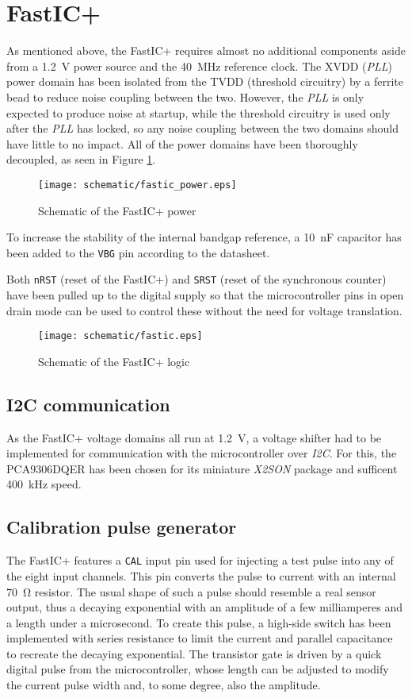\section{FastIC+}
As mentioned above, the FastIC+ requires almost no additional components aside from a \SI{1.2}{\volt} power source and the \SI{40}{\mega\hertz} reference clock. The XVDD (\emph{PLL}) power domain has been isolated from the TVDD (threshold circuitry) by a ferrite bead to reduce noise coupling between the two. However, the \emph{PLL} is only expected to produce noise at startup, while the threshold circuitry is used only after the \emph{PLL} has locked, so any noise coupling between the two domains should have little to no impact. All of the power domains have been thoroughly decoupled, as seen in Figure \ref{fig:fastic_power}.
%
\FloatBarrier
\begin{figure}[htp!]
    \centering
    \texttt{[image: schematic/fastic\_power.eps]}
    \caption{Schematic of the FastIC+ power}
    \label{fig:fastic_power}
\end{figure}
\FloatBarrier
%
To increase the stability of the internal bandgap reference, a \SI{10}{\nano\farad} capacitor has been added to the \verb|VBG| pin according to the datasheet.

Both \verb|nRST| (reset of the FastIC+) and \verb|SRST| (reset of the synchronous counter) have been pulled up to the digital supply so that the microcontroller pins in open drain mode can be used to control these without the need for voltage translation. 

\FloatBarrier
\begin{figure}[htp!]
    \centering
    \texttt{[image: schematic/fastic.eps]}
    \caption{Schematic of the FastIC+ logic}
    \label{fig:fastic}
\end{figure}
\FloatBarrier


%
\subsection{I2C communication}
As the FastIC+ voltage domains all run at \SI{1.2}{\volt}, a voltage shifter had to be implemented for communication with the microcontroller over \emph{I2C}. For this, the PCA9306DQER has been chosen for its miniature \emph{X2SON} package and sufficent \SI{400}{\kilo\hertz} speed. 
%
\subsection{Calibration pulse generator}
The FastIC+ features a \verb|CAL| input pin used for injecting a test pulse into any of the eight input channels. This pin converts the pulse to current with an internal \SI{70}{\ohm} resistor. The usual shape of such a pulse should resemble a real sensor output, thus a decaying exponential with an amplitude of a few milliamperes and a length under a microsecond. To create this pulse, a high-side switch has been implemented with series resistance to limit the current and parallel capacitance to recreate the decaying exponential. The transistor gate is driven by a quick digital pulse from the microcontroller, whose length can be adjusted to modify the current pulse width and, to some degree, also the amplitude.
%

